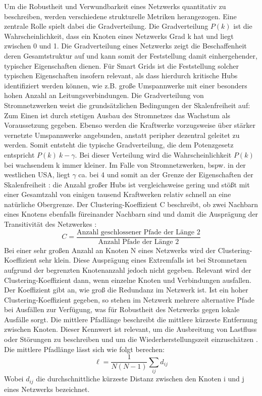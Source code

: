 \documentclass[14pt,a4paper]{scrartcl}
\begin{document}
Um die Robustheit und Verwundbarkeit eines Netzwerks quantitativ zu beschreiben, werden verschiedene strukturelle Metriken herangezogen. Eine zentrale Rolle spielt dabei die Gradverteilung.
Die Gradverteilung $P(k)$ ist die Wahrscheinlichkeit, dass ein Knoten eines Netzwerks Grad k hat und liegt zwischen 0 und 1. Die Gradverteilung eines Netzwerks zeigt die Beschaffenheit deren Gesamtstruktur auf und kann somit der Feststellung damit einhergehender, typischer Eigenschaften dienen. Für Smart Grids ist die Feststellung solcher typischen Eigenschaften insofern relevant, als dass hierdurch kritische Hubs identifiziert werden können, wie z.B. große Umspannwerke mit einer besonders hohen Anzahl an Leitungsverbindungen. Die Gradverteilung von Stromnetzwerken weist die grundsätzlichen Bedingungen der Skalenfreiheit auf: Zum Einen ist durch stetigen Ausbau des Stromnetzes das Wachstum als Voraussetzung gegeben. Ebenso werden die Kraftwerke vorzugsweise über stärker vernetzte Umspannwerke angebunden, anstatt peripher dezentral geleitet zu werden. Somit entsteht die typische Gradverteilung, die dem Potenzgesetz entspricht $P(k) ~ k-\gamma$. Bei dieser Verteilung wird die Wahrscheinlichkeit $P(k)$ bei wachsendem k immer kleiner. Im Falle von Stromnetzwerken, bspw. in der westlichen USA, liegt $\gamma$ ca. bei 4 und somit an der Grenze der Eigenschaften der Skalenfreiheit : die Anzahl großer Hubs ist vergleichsweise gering und stößt mit einer Gesamtzahl von einigen tausend Kraftwerken relativ schnell an eine natürliche Obergrenze. 
Der Clustering-Koeffizient C beschreibt, ob zwei Nachbarn eines Knotens ebenfalls füreinander Nachbarn sind und damit die Ausprägung der Transitivität des Netzwerkes : 
\[
C = \frac{\text{Anzahl geschlossener Pfade der L\"ange 2}}{\text{Anzahl Pfade der L\"ange 2}}
\]
Bei einer sehr großen Anzahl an Knoten N eines Netzwerks wird der Clustering-Koeffizient sehr klein. Diese Ausprägung eines Extremfalls ist bei Stromnetzen aufgrund der begrenzten Knotenanzahl jedoch nicht gegeben. Relevant wird der Clustering-Koeffizient dann, wenn einzelne Knoten und Verbindungen ausfallen. Der Koeffizient gibt an, wie groß die Redundanz im Netzwerk ist. Ist ein hoher Clustering-Koeffizient gegeben, so stehen im Netzwerk mehrere alternative Pfade bei Ausfällen zur Verfügung, was für Robustheit des Netzwerks gegen lokale Ausfälle sorgt. 
Die mittlere Pfadlänge beschreibt die mittlere kürzeste Entfernung zwischen Knoten. Dieser Kennwert ist relevant, um die Ausbreitung von Lastfluss oder Störungen zu beschreiben und um die Wiederherstellungszeit einzuschätzen . Die mittlere Pfadlänge lässt sich wie folgt berechen:
\[
\ell = \frac{1}{N(N-1)} \sum_{i j} d_{i j}
\]
Wobei $d_{ij}$ die durchschnittliche kürzeste Distanz zwischen den Knoten i und j eines Netzwerks bezeichnet.
\end{document}
